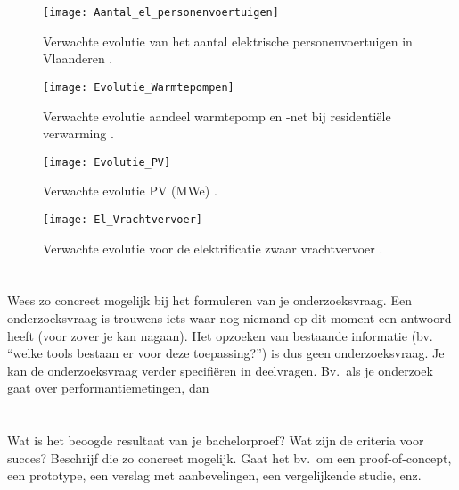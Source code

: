 \begin{figure}
    \centering\texttt{[image: Aantal\_el\_personenvoertuigen]}
    \caption{\label{fig:Aantal_el_personenvoertuigen}Verwachte evolutie van het aantal
        elektrische personenvoertuigen in Vlaanderen \autocite{Verdoodt2022}.}
\end{figure}

\begin{figure}
    \centering\texttt{[image: Evolutie\_Warmtepompen]}
    \caption{\label{fig:Evolutie_Warmtepompen}Verwachte evolutie aandeel warmtepomp en -net bij
        residentiële verwarming \autocite{Verdoodt2022}.}
\end{figure}

\begin{figure}
    \centering\texttt{[image: Evolutie\_PV]}
    \caption{\label{fig:Evolutie_PV}Verwachte evolutie PV (MWe) \autocite{Verdoodt2022}.}
\end{figure}

\begin{figure}
    \centering\texttt{[image: El\_Vrachtvervoer]}
    \caption{\label{fig:El_Vrachtvervoer}Verwachte evolutie voor de elektrificatie zwaar
        vrachtvervoer \autocite{Verdoodt2022}.}
\end{figure}

\section{}%
\label{sec:onderzoeksvraag}

Wees zo concreet mogelijk bij het formuleren van je onderzoeksvraag. Een onderzoeksvraag is trouwens iets waar nog niemand op dit moment een antwoord heeft (voor zover je kan nagaan). Het opzoeken van bestaande informatie (bv. ``welke tools bestaan er voor deze toepassing?'') is dus geen onderzoeksvraag. Je kan de onderzoeksvraag verder specifiëren in deelvragen. Bv.~als je onderzoek gaat over performantiemetingen, dan 

\section{}%
\label{sec:onderzoeksdoelstelling}

Wat is het beoogde resultaat van je bachelorproef? Wat zijn de criteria voor succes? Beschrijf die zo concreet mogelijk. Gaat het bv.\ om een proof-of-concept, een prototype, een verslag met aanbevelingen, een vergelijkende studie, enz.

